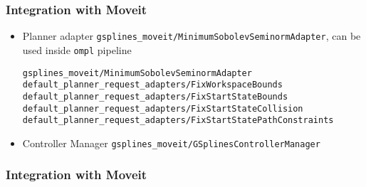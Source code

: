 \begin{frame}[fragile]
	\frametitle{Integration with Moveit}
	\begin{itemize}
		\item Planner adapter \Verb|gsplines_moveit/MinimumSobolevSeminormAdapter|, can be used inside \Verb|ompl| pipeline
		      \begin{lstlisting}
gsplines_moveit/MinimumSobolevSeminormAdapter
default_planner_request_adapters/FixWorkspaceBounds
default_planner_request_adapters/FixStartStateBounds
default_planner_request_adapters/FixStartStateCollision
default_planner_request_adapters/FixStartStatePathConstraints
	          \end{lstlisting}
		\item  Controller Manager \Verb|gsplines_moveit/GSplinesControllerManager|
	\end{itemize}

\end{frame}

\begin{frame}[t]
	\frametitle{Integration with Moveit}

\end{frame}
